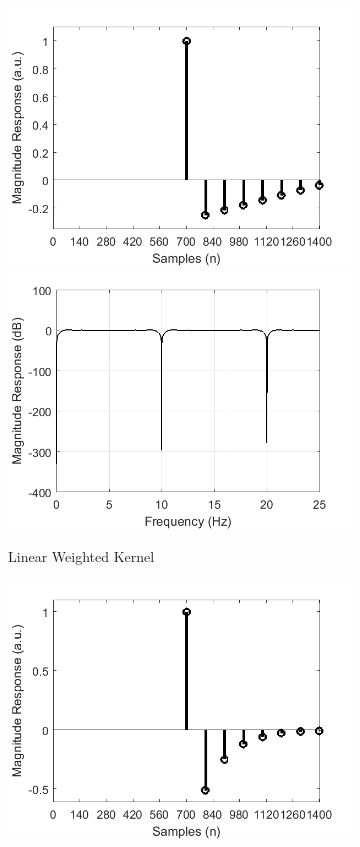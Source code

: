 \documentclass[a4paper]{article}
\begin{document}
\begin{figure}[hbtp]
\begin{subfigure}{.33\textwidth}
    \includegraphics[width=\textwidth]{img/kernel_linear.png}\\
    \includegraphics[width=\textwidth]{img/mag_linear.png}
    \caption{Linear Weighted Kernel}\label{fig:LinearKernel}
\end{subfigure}
\begin{subfigure}{.33\textwidth}
    \includegraphics[width=\textwidth]{img/kernel_exp.png}\\

\end{subfigure}
\end{figure}
\end{document}
